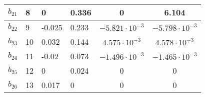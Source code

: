 \begin{table}[h!]
\begin{tabular}{|p{1.5cm}|p{1.5cm}|p{1.5cm}|p{1.5cm}|c|c|}
    \hline
    $b_{21}$ & 8 & 0 & 0.336 & 0 & 6.104 \\
    \hline
    $b_{22}$ & 9 & -0.025 & 0.233 & $-5.821\cdot10^{-3}$ & $-5.798\cdot10^{-3}$ \\
    \hline
    $b_{23}$ & 10 & 0.032 & 0.144 & $4.575\cdot10^{-3}$ & $4.578\cdot10^{-3}$ \\
    \hline
    $b_{24}$ & 11 & -0.02 & 0.073 & $-1.496\cdot10^{-3}$ & $-1.465\cdot10^{-3}$ \\
    \hline
    $b_{25}$ & 12 & 0 & 0.024 & 0 & 0 \\
    \hline
    $b_{26}$ & 13 & 0.017 & 0 & 0 & 0 \\
    \hline
  \end{tabular}
  \label{tab:nonrekurs}
\end{table}
\newpage



